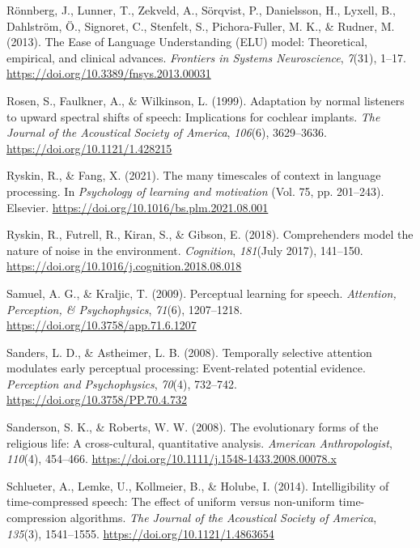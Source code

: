\documentclass[a4paper, nobind]{templates/ociamthesis}
\newlength{\cslhangindent}
\newenvironment{CSLReferences}[2] %
 {%
  \setlength{\parindent}{0pt}
  \ifodd #1
  \let\oldpar\par
  \def\par{\hangindent=\cslhangindent\oldpar}
  \fi
  \setlength{\parskip}{1mm}
  \setlength{\baselineskip}{6mm}
 }%
 {}
\begin{document}
\begin{CSLReferences}{1}{0}
\leavevmode{}%
Rönnberg, J., Lunner, T., Zekveld, A., Sörqvist, P., Danielsson, H., Lyxell, B., Dahlström, Ö., Signoret, C., Stenfelt, S., Pichora-Fuller, M. K., \& Rudner, M. (2013). {The Ease of Language Understanding (ELU) model: Theoretical, empirical, and clinical advances}. \emph{Frontiers in Systems Neuroscience}, \emph{7}(31), 1--17. \url{https://doi.org/10.3389/fnsys.2013.00031}

\leavevmode{}%
Rosen, S., Faulkner, A., \& Wilkinson, L. (1999). Adaptation by normal listeners to upward spectral shifts of speech: Implications for cochlear implants. \emph{The Journal of the Acoustical Society of America}, \emph{106}(6), 3629--3636. \url{https://doi.org/10.1121/1.428215}

\leavevmode{}%
Ryskin, R., \& Fang, X. (2021). The many timescales of context in language processing. In \emph{Psychology of learning and motivation} (Vol. 75, pp. 201--243). Elsevier. \url{https://doi.org/10.1016/bs.plm.2021.08.001}

\leavevmode{}%
Ryskin, R., Futrell, R., Kiran, S., \& Gibson, E. (2018). {Comprehenders model the nature of noise in the environment}. \emph{Cognition}, \emph{181}(July 2017), 141--150. \url{https://doi.org/10.1016/j.cognition.2018.08.018}

\leavevmode{}%
Samuel, A. G., \& Kraljic, T. (2009). Perceptual learning for speech. \emph{Attention, Perception, \& Psychophysics}, \emph{71}(6), 1207--1218. \url{https://doi.org/10.3758/app.71.6.1207}

\leavevmode{}%
Sanders, L. D., \& Astheimer, L. B. (2008). {Temporally selective attention modulates early perceptual processing: Event-related potential evidence}. \emph{Perception and Psychophysics}, \emph{70}(4), 732--742. \url{https://doi.org/10.3758/PP.70.4.732}

\leavevmode{}%
Sanderson, S. K., \& Roberts, W. W. (2008). {The evolutionary forms of the religious life: A cross-cultural, quantitative analysis}. \emph{American Anthropologist}, \emph{110}(4), 454--466. \url{https://doi.org/10.1111/j.1548-1433.2008.00078.x}

\leavevmode{}%
Schlueter, A., Lemke, U., Kollmeier, B., \& Holube, I. (2014). {Intelligibility of time-compressed speech: The effect of uniform versus non-uniform time-compression algorithms}. \emph{The Journal of the Acoustical Society of America}, \emph{135}(3), 1541--1555. \url{https://doi.org/10.1121/1.4863654}


\end{CSLReferences}
\end{document}
